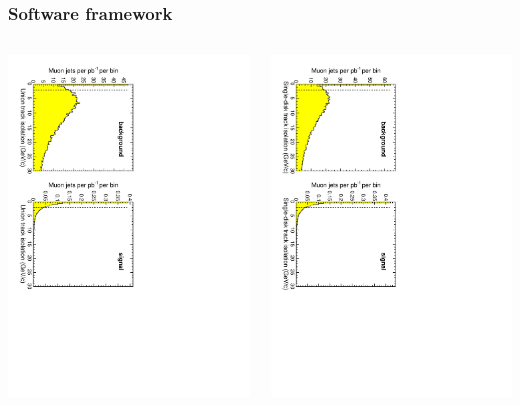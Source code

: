 \documentclass[compress]{beamer}
\begin{document}
\begin{frame}
\frametitle{Software framework}

\begin{columns}
\includegraphics[height=\linewidth, angle=90]{backgrounds_isolation_muontrack.pdf}

\includegraphics[height=\linewidth, angle=90]{backgrounds_isolation_jpsitrack.pdf}


\end{columns}
\end{frame}
\end{document}
